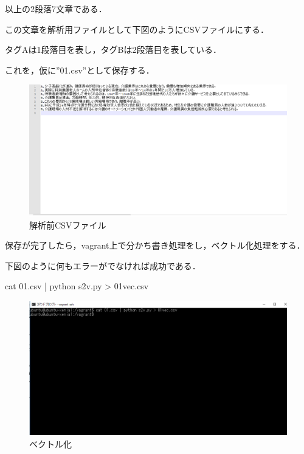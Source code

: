 以上の2段落7文章である．
\newpage

この文章を解析用ファイルとして下図のようにCSVファイルにする．

タグAは1段落目を表し，タグBは2段落目を表している．

これを，仮に”01.csv”として保存する．
\begin{figure}[htb]
\centering
\includegraphics[width=13cm]{4-32.png}
\caption{解析前CSVファイル}\label{4-32}
\end{figure}
\newpage

保存が完了したら，vagrant上で分かち書き処理をし，ベクトル化処理をする．

下図のように何もエラーがでなければ成功である．

cat 01.csv | python s2v.py > 01vec.csv

\begin{figure}[htb]
\centering
\includegraphics[width=13cm]{4-33.png}
\caption{ベクトル化}\label{4-33}
\end{figure}
\newpage

